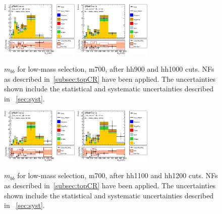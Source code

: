 \begin{figure}[!h]
\begin{center}
\includegraphics*[width=0.33\textwidth] {figures/ControlPlots/reOpt700_bbMass_allMhh/C_reOpt700_mww_bbpt210_wwpt250_hh900c_bbMass_regionA_met25d020}
\includegraphics*[width=0.33\textwidth] {figures/ControlPlots/reOpt700_bbMass_allMhh/C_reOpt700_mww_bbpt210_wwpt250_hh1000c_bbMass_regionA_met25d020}
\caption[$m_{bb}$ for low-mass selection, m700, after hh900 and hh1000 cuts.]{$m_{bb}$ for low-mass selection, m700, after hh900 and hh1000 cuts. \ttbar NFs as described in~\ref{subsec:topCR} have been applied. The uncertainties shown include the statistical and systematic uncertainties described in ~\ref{sec:syst}.}
\end{center}
\end{figure}

\begin{figure}[!h]
\begin{center}
\includegraphics*[width=0.33\textwidth] {figures/ControlPlots/reOpt700_bbMass_allMhh/C_reOpt700_mww_bbpt210_wwpt250_hh1100c_bbMass_regionA_met25d020}
\includegraphics*[width=0.33\textwidth] {figures/ControlPlots/reOpt700_bbMass_allMhh/C_reOpt700_mww_bbpt210_wwpt250_hh1200c_bbMass_regionA_met25d020}
\caption[$m_{bb}$ for low-mass selection, m700, after hh1100 and hh1200 cuts.]{$m_{bb}$ for low-mass selection, m700, after hh1100 and hh1200 cuts. \ttbar NFs as described in~\ref{subsec:topCR} have been applied. The uncertainties shown include the statistical and systematic uncertainties described in ~\ref{sec:syst}.}
\end{center}
\end{figure}


